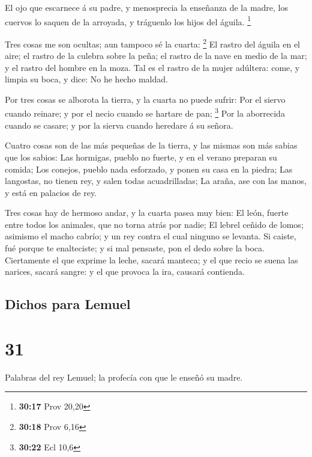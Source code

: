  El ojo que escarnece á su padre, y menosprecia la
enseñanza de la madre, los cuervos lo saquen de la arroyada, y tráguenlo
los hijos del águila. \footnote{\textbf{30:17} Prov 20,20}

 Tres cosas me son ocultas; aun tampoco sé la cuarta:
\footnote{\textbf{30:18} Prov 6,16}  El rastro del águila
en el aire; el rastro de la culebra sobre la peña; el rastro de la nave
en medio de la mar; y el rastro del hombre en la moza.  Tal
es el rastro de la mujer adúltera: come, y limpia su boca, y dice: No he
hecho maldad.

 Por tres cosas se alborota la tierra, y la cuarta no puede
sufrir:  Por el siervo cuando reinare; y por el necio
cuando se hartare de pan; \footnote{\textbf{30:22} Ecl 10,6}
 Por la aborrecida cuando se casare; y por la sierva cuando
heredare á su señora.

 Cuatro cosas son de las más pequeñas de la tierra, y las
mismas son más sabias que los sabios:  Las hormigas, pueblo
no fuerte, y en el verano preparan su comida;  Los conejos,
pueblo nada esforzado, y ponen su casa en la piedra;  Las
langostas, no tienen rey, y salen todas acuadrilladas;  La
araña, ase con las manos, y está en palacios de rey.

 Tres cosas hay de hermoso andar, y la cuarta pasea muy
bien:  El león, fuerte entre todos los animales, que no
torna atrás por nadie;  El lebrel ceñido de lomos; asimismo
el macho cabrío; y un rey contra el cual ninguno se levanta.
 Si caiste, fué porque te enalteciste; y si mal pensaste,
pon el dedo sobre la boca.  Ciertamente el que exprime la
leche, sacará manteca; y el que recio se suena las narices, sacará
sangre: y el que provoca la ira, causará contienda.

\hypertarget{dichos-para-lemuel}{%
\subsection{Dichos para Lemuel}\label{dichos-para-lemuel}}

\hypertarget{section-30}{%
\section{31}\label{section-30}}

 Palabras del rey Lemuel; la profecía con que le enseñó su
madre.

